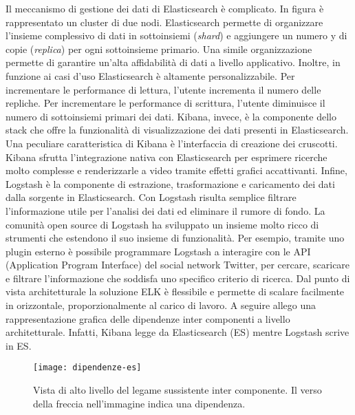 \begin{itemize}
	Il meccanismo di gestione dei dati di Elasticsearch è complicato. In 
figura è rappresentato un cluster di due nodi. Elasticsearch permette di 
organizzare l'insieme complessivo di dati in sottoinsiemi (\textit{shard}) e 
aggiungere un numero y di copie (\textit{replica}) per ogni sottoinsieme 
primario. Una simile organizzazione permette di garantire un'alta affidabilità 
di dati 
	a livello applicativo. Inoltre, in funzione ai casi d'uso Elasticsearch 
è altamente personalizzabile.
	Per incrementare le performance di lettura, l'utente incrementa il 
numero delle repliche. Per incrementare le performance di scrittura, l'utente 
diminuisce il numero di sottoinsiemi primari dei dati. 	
	Kibana, invece, è la componente dello stack che offre la funzionalità 
di visualizzazione dei dati presenti in Elasticsearch. Una peculiare 
caratteristica di Kibana è l'interfaccia di creazione dei cruscotti. Kibana 
sfrutta l'integrazione nativa con Elasticsearch per esprimere ricerche molto 
complesse e renderizzarle a video tramite effetti grafici accattivanti. Infine, 
Logstash è la componente di estrazione, trasformazione e caricamento dei dati 
dalla sorgente in Elasticsearch. Con Logstash risulta semplice filtrare 
l'informazione utile per l'analisi dei dati ed eliminare il rumore di fondo. La 
comunità open source di Logstash ha sviluppato un insieme molto ricco di 
strumenti che estendono il suo insieme di funzionalità. Per esempio, tramite 
uno plugin esterno è possibile programmare Logstash a interagire con le API 
(Application Program Interface) del social network Twitter, per cercare, 
scaricare e filtrare l'informazione che soddisfa uno specifico criterio di 
ricerca. 
	Dal punto di vista architetturale la soluzione ELK è flessibile e 
permette di scalare facilmente in orizzontale, proporzionalmente al carico di 
lavoro. 
	A seguire allego una rappresentazione grafica delle dipendenze inter 
componenti a livello architetturale. Infatti, Kibana legge da Elasticsearch 
(ES) mentre Logstash scrive in ES.
	
	\begin{figure}[htbp]
		\begin{center}
			\texttt{[image: dipendenze-es]}
			\caption{Vista di alto livello del legame sussistente 
inter componente. Il verso della freccia nell'immagine indica una dipendenza.}
		\end{center}
	\end{figure}
	
	  	
\end{itemize}

